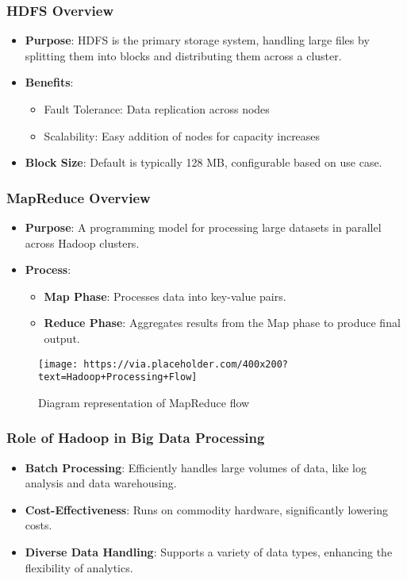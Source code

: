 \documentclass[aspectratio=169]{beamer}
\begin{document}
\begin{frame}[fragile]
    \frametitle{HDFS Overview}
    \begin{itemize}
        \item \textbf{Purpose}: HDFS is the primary storage system, handling large files by splitting them into blocks and distributing them across a cluster.
        \item \textbf{Benefits}:
        \begin{itemize}
            \item Fault Tolerance: Data replication across nodes
            \item Scalability: Easy addition of nodes for capacity increases
        \end{itemize}
        \item \textbf{Block Size}: Default is typically 128 MB, configurable based on use case.
    \end{itemize}
\end{frame}

\begin{frame}[fragile]
    \frametitle{MapReduce Overview}
    \begin{itemize}
        \item \textbf{Purpose}: A programming model for processing large datasets in parallel across Hadoop clusters.
        \item \textbf{Process}:
        \begin{itemize}
            \item \textbf{Map Phase}: Processes data into key-value pairs.
            \item \textbf{Reduce Phase}: Aggregates results from the Map phase to produce final output.
        \end{itemize}
    \end{itemize}

    \begin{figure}
        \centering
        \texttt{[image: https://via.placeholder.com/400x200?text=Hadoop+Processing+Flow]}
        \caption{Diagram representation of MapReduce flow}
    \end{figure}
\end{frame}

\begin{frame}[fragile]
    \frametitle{Role of Hadoop in Big Data Processing}
    \begin{itemize}
        \item \textbf{Batch Processing}: Efficiently handles large volumes of data, like log analysis and data warehousing.
        \item \textbf{Cost-Effectiveness}: Runs on commodity hardware, significantly lowering costs.
        \item \textbf{Diverse Data Handling}: Supports a variety of data types, enhancing the flexibility of analytics.
    \end{itemize}
\end{frame}
\end{document}
